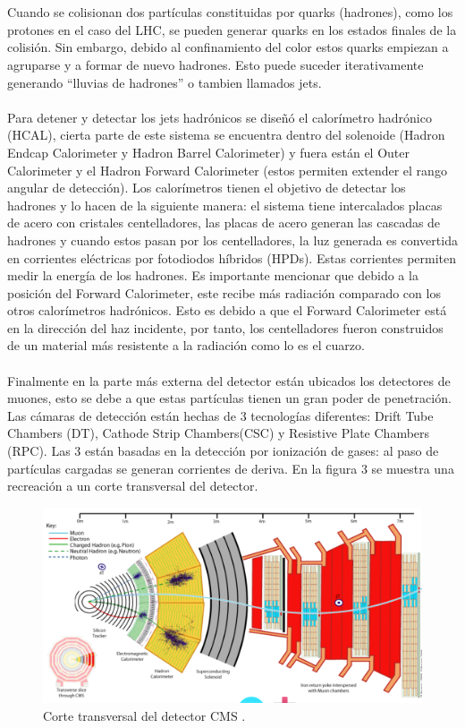 \\
\\
Cuando se colisionan dos partículas constituidas por quarks (hadrones), como los protones en el caso del LHC, se pueden generar quarks en los estados finales de la colisión. Sin embargo, debido al confinamiento del color estos quarks empiezan a agruparse y a formar de nuevo hadrones. Esto puede suceder iterativamente generando ``lluvias de hadrones'' o tambien llamados jets.
\\
\\
Para detener y detectar los jets hadrónicos se diseñó el calorímetro hadrónico (HCAL), cierta parte de este sistema se encuentra dentro del solenoide (Hadron Endcap Calorimeter y Hadron Barrel Calorimeter) y fuera están el Outer Calorimeter y el Hadron Forward Calorimeter (estos permiten extender el rango angular de detección). Los calorímetros tienen el objetivo de detectar los hadrones y lo hacen de la siguiente manera: el sistema tiene intercalados placas de acero con cristales centelladores, las placas de acero generan las cascadas de hadrones y cuando estos pasan por los centelladores, la luz generada es convertida en corrientes eléctricas por fotodiodos híbridos (HPDs). Estas corrientes permiten medir la energía de los hadrones. Es importante mencionar que debido a la posición del Forward Calorimeter, este recibe más radiación comparado con los otros calorímetros hadrónicos. Esto es debido a que el Forward Calorimeter está en la dirección del haz incidente, por tanto, los centelladores fueron construidos de un material más resistente a la radiación como lo es el cuarzo.
\\
\\
Finalmente en la parte más externa del detector están ubicados los detectores de muones, esto se debe a que estas partículas tienen un gran poder de penetración. Las cámaras de detección están hechas de 3 tecnologías diferentes: Drift Tube Chambers (DT), Cathode Strip Chambers(CSC) y Resistive Plate Chambers (RPC). Las 3 están basadas en la detección por ionización de gases: al paso de partículas cargadas se generan corrientes de deriva. En la figura 3 se muestra una recreación a un corte transversal del detector.
\begin{figure}
\centering
\includegraphics[width=15cm]{F3.png}
\caption{\label{fig:frog} Corte transversal del detector CMS \cite{Bayatian:2006nff}.}
\end{figure}


